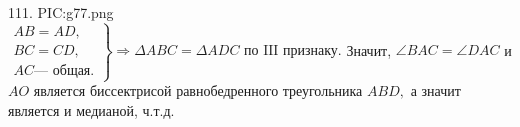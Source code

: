111. {{PIC:g77.png}}\\
$\left.\begin{array}{l}AB=AD,\\
BC=CD,\\
AC\text{--- общая.}  \end{array}\right\}\Rightarrow \Delta ABC=\Delta ADC\text{ по III признаку.}$ Значит, $\angle BAC=\angle DAC$ и $AO$ является биссектрисой равнобедренного треугольника $ABD,$ а значит является и медианой, ч.т.д.\\
